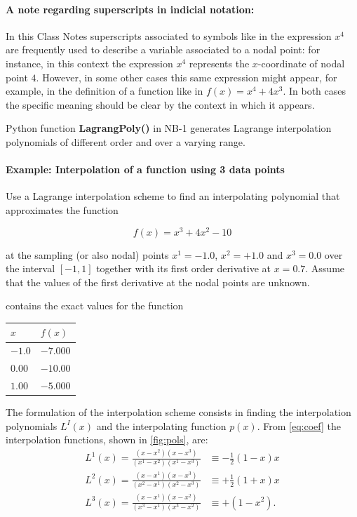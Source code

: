 \begin{tcolorbox}
\paragraph*{A note regarding superscripts in indicial notation:} In this Class Notes superscripts associated to symbols like in the expression $x^4$ are frequently used to describe a variable associated to a nodal point: for instance, in this context the expression $x^4$ represents the $x$-coordinate of nodal point $4$. However, in some other cases this same expression might appear, for example, in the definition of a function like in $f(x) = {x^4} + 4{x^3}$. In both cases the specific meaning should be clear by the context in which it appears.

Python function {\bf LagrangPoly()} in NB-1 generates Lagrange interpolation polynomials of different order and over a varying range.
\end{tcolorbox}

\paragraph*{Example: Interpolation of a function using 3 data points}

Use a Lagrange interpolation scheme to find an interpolating polynomial that approximates the function 

\[ f(x) = {x^3} + 4{x^2} - 10 \]

at the sampling (or also nodal) points ${x^1} =  - 1.0$, ${x^2} =  + 1.0$ and ${x^3} = 0.0$ over the interval $[-1,1]$ together with its first order derivative at $x = 0.7$.  Assume that the values of the first derivative at the nodal points are unknown. 

 contains the exact values for the function

\begin{center}
\begin{tabular}{ll}
  \hline
  $x$ & $f(x)$ \\
  \hline 
  $-1.0$  & $-7.000$  \\
  $ 0.00$  & $-10.00$  \\
  $ 1.00$  & $-5.000$  \\
  \hline
\end{tabular}
\label{ejemplo2}
\end{center}

The formulation of the interpolation scheme consists in finding the interpolation polynomials $L^I(x)$ and the interpolating function $p(x)$. From \cref{eq:coef} the interpolation functions, shown in \cref{fig:pols}, are:
\begin{align*}
L^1(x) = \frac{(x - x^2)(x - x^3)}{(x^1 - x^2)(x^1-x^3)} & \equiv  - \frac{1}{2}(1 -  x)x\\
L^2(x) = \frac{(x - x^1)(x - x^3)}{(x^2 - x^1)(x^2 - x^3)} & \equiv +   \frac{1}{2}(1 + x)x\\
L^3(x) = \frac{(x - x^1)(x - x^2)}{(x^3 - x^1)(x^3 - x^2)} & \equiv + (1 - x^2).
\end{align*}

